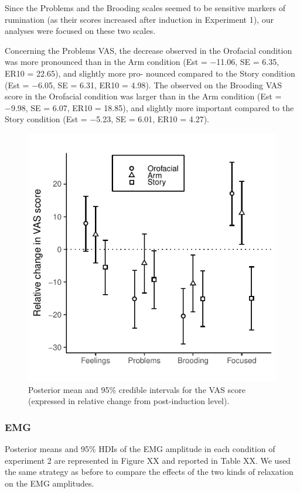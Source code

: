 \documentclass[a4paper,12pt,twoside,openright,oldfontcommands]{memoir}
\begin{document}
Since the Problems and the Brooding scales seemed to be sensitive
markers of rumination (as their scores increased after induction in
Experiment 1), our analyses were focused on these two scales.

Concerning the Problems VAS, the decrease observed in the Orofacial
condition was more pronounced than in the Arm condition (Est = −11.06,
SE = 6.35, ER10 = 22.65), and slightly more pro- nounced compared to the
Story condition (Est = −6.05, SE = 6.31, ER10 = 4.98). The observed on
the Brooding VAS score in the Orofacial condition was larger than in the
Arm condition (Est = −9.98, SE = 6.07, ER10 = 18.85), and slightly more
important compared to the Story condition (Est = −5.23, SE = 6.01, ER10
= 4.27).

\begin{figure}[H]

{\centering \includegraphics[width=0.75\linewidth]{assets/emg_fig2} 

}

\caption{Posterior mean and 95\% credible intervals for the VAS score (expressed in relative change from post-induction level).}\label{fig:resultsemgfig2}
\end{figure}

\subsubsection{EMG}\label{emg-1}

Posterior means and 95\% HDIs of the EMG amplitude in each condition of
experiment 2 are represented in Figure XX and reported in Table XX. We
used the same strategy as before to compare the effects of the two kinds
of relaxation on the EMG amplitudes.
\end{document}
